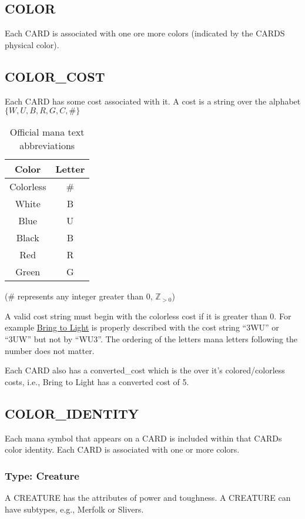 \documentclass{article}
\begin{document}
\subsection{COLOR}
Each CARD is associated with one ore more colors (indicated by the CARDS physical color).
\subsection{COLOR\_COST}
Each CARD has some cost associated with it. A cost is a string over the alphabet $\{W, U, B, R, G, C, \#\}$
\begin{table}[h!] %
    \centering
    \caption{Official mana text abbreviations}
    \label{tab:cost_table}
    \begin{tabular}{cc}
        Color & Letter \\
        \hline
        Colorless & \# \\
        White & B \\
        Blue & U \\
        Black & B \\
        Red & R \\
        Green & G \\
        \hline
    \end{tabular}
\end{table}
(\# represents any integer greater than 0, $ \mathbb{Z}_{>0}$)

A valid cost string must begin with the colorless cost if it is greater than 0. For example \href{https://scryfall.com/card/pbfz/209s/bring-to-light}{\underline{Bring to Light}} is properly described with the cost string ``3WU'' or ``3UW'' but not by ``WU3''. The ordering of the letters mana letters following the number does not matter.

Each CARD also has a converted\_cost which is the over it's colored/colorless costs, i.e., Bring to Light has a converted cost of 5. 
\subsection{COLOR\_IDENTITY}
Each mana symbol that appears on a CARD is included within that CARDs color identity. Each CARD is associated with one or more colors.
\subsubsection{Type: Creature}
A CREATURE has the attributes of power and toughness. %
A CREATURE can have subtypes, e.g., Merfolk or Slivers.
\end{document}
